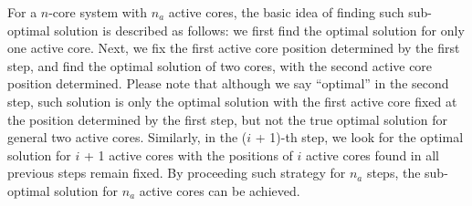 For a $n$-core system with $n_{a}$ active cores, the basic idea of finding such sub-optimal solution is described as follows: we first find the optimal solution for only one active core. Next, we fix the first active core position determined by the first step, and find the optimal solution of two cores, with the second active core position determined. Please note that although we say “optimal” in the second step, such solution is only the optimal solution with the first active core fixed at the position determined by the first step, but not the true optimal solution for general two active cores. Similarly, in the ($i$ + 1)-th step, we look for the optimal solution for $i$ + 1 active cores with the positions of $i$ active cores found in all previous steps remain fixed. By proceeding such strategy for $n_{a}$ steps, the sub-optimal solution for $n_{a}$ active cores can be achieved.